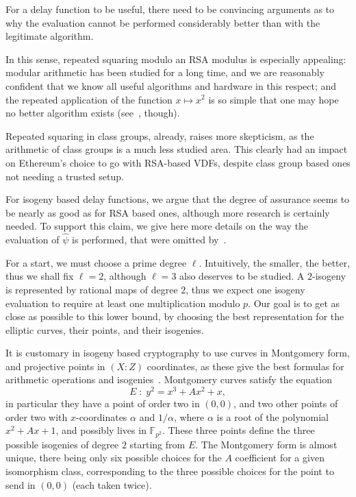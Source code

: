 \documentclass{llncs}
\newcommand{\F}{\mathbb{F}}
\begin{document}
For a delay function to be useful, there need to be convincing
arguments as to why the evaluation cannot be performed considerably
better than with the legitimate algorithm.

In this sense, repeated squaring modulo an RSA modulus is especially
appealing: modular arithmetic has been studied for a long time, and we
are reasonably confident that we know all useful algorithms and
hardware in this respect; and the repeated application of the function
$x\mapsto x^2$ is so simple that one may hope no better algorithm
exists (see~\cite{BernsteinSorenson07}, though).

Repeated squaring in class groups, already, raises more skepticism, as
the arithmetic of class groups is a much less studied area. %
This clearly had an impact on Ethereum's choice to go with RSA-based
VDFs, despite class group based ones not needing a trusted setup.

For isogeny based delay functions, we argue that the degree of
assurance seems to be nearly as good as for RSA based ones, although
more research is certainly needed. %
To support this claim, we give here more details on the way the
evaluation of $\hat\psi$ is performed, that were omitted
by~\cite{10.1007/978-3-030-34578-5_10}.

For a start, we must choose a prime degree $\ell$. %
Intuitively, the smaller, the better, thus we shall fix $\ell=2$,
although $\ell=3$ also deserves to be studied. %
A $2$-isogeny is represented by rational maps of degree $2$, thus we
expect one isogeny evaluation to require at least one multiplication
modulo $p$. %
Our goal is to get as close as possible to this lower bound, by
choosing the best representation for the elliptic curves, their
points, and their isogenies.

It is customary in isogeny based cryptography to use curves in
Montgomery form, and projective points in $(X:Z)$ coordinates, as
these give the best formulas for arithmetic operations and
isogenies~\cite{costello2016sidh,10.1007/978-3-319-79063-3_11}. %
Montgomery curves satisfy the equation
\[E \;:\; y^2 = x^3 + Ax^2 + x,\] %
in particular they have a point of order two in $(0,0)$, and two other
points of order two with $x$-coordinates $\alpha$ and $1/\alpha$,
where $\alpha$ is a root of the polynomial $x^2+Ax+1$, and possibly
lives in $\F_{p^2}$. %
These three points define the three possible isogenies of degree $2$
starting from $E$. %
The Montgomery form is almost unique, there being only six possible
choices for the $A$ coefficient for a given isomorphism class,
corresponding to the three possible choices for the point to send in
$(0,0)$ (each taken twice).
\end{document}
